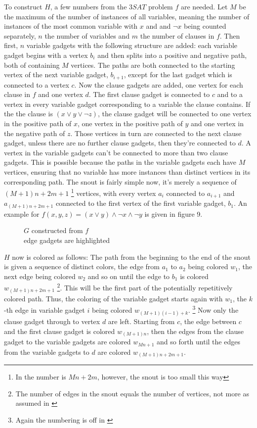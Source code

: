 \documentclass[12pt,a4paper]{article}
\begin{document}
To construct $H$, a few numbers from the $3SAT$ problem $f$ are needed. Let $M$ be the maximum of the  number of instances of all variables, meaning the number of instances of the most common variable with $x$ and and $\neg x$ being counted separately, $n$ the number of variables and $m$ the number of clauses in $f$. Then first, $n$ variable gadgets with the following structure are added: each variable gadget begins with a vertex $b_i$ and then splits into a positive and negative path, both of containing $M$ vertices. The paths are both connected to the starting vertex of the next variable gadget, $b_{i+1}$, except for the last gadget which is connected to a vertex $c$. Now the clause gadgets are added, one vertex for each clause in $f$ and one vertex $d$. The first clause gadget is connected to $c$ and to a vertex in every variable gadget corresponding to a variable the clause contains. If the the clause is $(x \vee y \vee \neg z)$, the clause gadget will be connected to one vertex in the positive path of $x$, one vertex in the positive path of $y$ and one vertex in the negative path of $z$. Those vertices in turn are connected to the next clause gadget, unless there are no further clause gadgets, then they're connected to $d$. A vertex in the variable gadgets can't be connected to more than two clause gadgets. This is possible because the paths in the variable gadgets each have $M$ vertices, ensuring that no variable has more instances than distinct vertices in its corresponding path. The snout is fairly simple now, it's merely a sequence of $(M+1)n+2m+1$ \footnote{In \citep{Manin2008} the number is $Mn+2m$, however, the snout is too small this way} vertices, with every vertex $a_i$ connected to $a_{i+1}$ and $a_{(M+1)n+2m+1}$ connected to the first  vertex of the first variable gadget, $b_1$. An example for $f(x, y, z) = (x \vee y) \wedge \neg x \wedge \neg y$ is given in figure 9. 
\begin{figure}[h]
	
	\caption{$G$ constructed from $f$ \\edge gadgets are highlighted}
\end{figure}
\newline
$H$ now is colored as follows: The path from the beginning to the end of the snout is given a sequence of distinct colors, the edge from $a_1$ to $a_2$ being colored $w_1$, the next edge being colored $w_2$ and so on until the edge to $b_1$ is colored $w_{(M+1)n+2m+1}$ \footnote{The number of edges in the snout equals the number of vertices, not more as assumed in \citep{Manin2008}}. This will be the first part of the potentially repetitively colored path. Thus, the coloring of the variable gadget starts again with $w_1$, the $k$-th edge in variable gadget $i$ being colored $w_{(M+1)(i-1)+k}$. \footnote{Again the numbering is off in \citep{Manin2008}} Now only the clause gadget through to vertex $d$ are left. Starting from $c$, the edge between $c$ and the first clause gadget is colored $w_{(M+1)n}$, then the edges from the clause gadget to the variable gadgets are colored $w_{Mn+1}$ and so forth until the edges from the variable gadgets to $d$ are colored $w_{(M+1)n+2m+1}$. 
\end{document}
